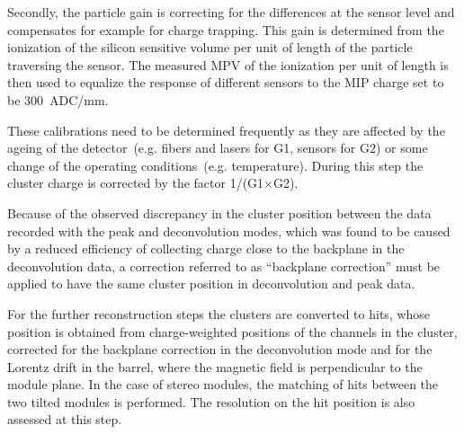 Secondly, the particle gain is correcting for the differences at the sensor level and compensates for example for charge trapping. This gain is determined from the ionization of the silicon sensitive volume per unit of length of the particle traversing the sensor. The measured MPV of the ionization per unit of length is then used to equalize the response of different sensors to the MIP charge set to be 300~ADC/mm. 

These calibrations need to be determined frequently as they are affected by the ageing of the detector~(e.g. fibers and lasers for G1,  sensors for G2) or some change of the operating conditions~(e.g. temperature). During this step the cluster charge is corrected by the factor 1/(G1$\times$G2).

Because of the observed discrepancy in the cluster position between the data recorded with the peak and deconvolution modes, which was found to be caused by a reduced efficiency of collecting charge close to the backplane in the deconvolution data, a correction referred to as ``backplane correction'' must be applied to have the same cluster position in deconvolution and peak data.

For the further reconstruction steps the clusters are converted to hits, whose position is obtained from charge-weighted positions of the channels in the cluster, corrected for the backplane correction in the deconvolution mode and for the Lorentz drift in the barrel, where the magnetic field is perpendicular to the module plane. In the case of stereo modules, the matching of hits between the two tilted modules is performed. The resolution on the hit position is also assessed at this step.



